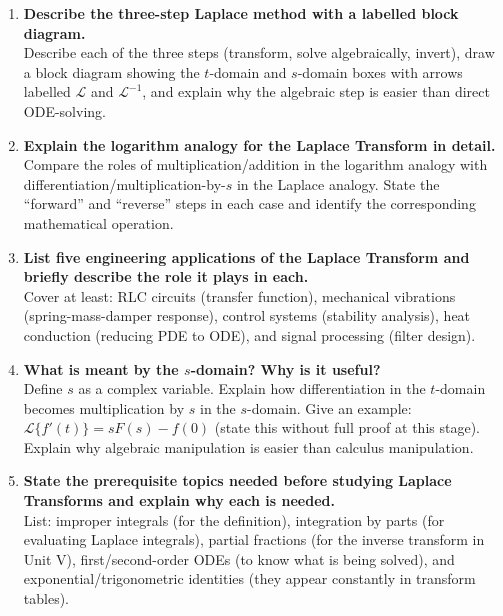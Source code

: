 \documentclass[12pt,a4paper]{article}
\begin{document}
\begin{enumerate}[label=\textbf{Q\arabic*.}, leftmargin=*, itemsep=8pt]

  \item \textbf{Describe the three-step Laplace method with a labelled block
        diagram.} \\
        Describe each of the three steps (transform, solve algebraically,
        invert), draw a block diagram showing the $t$-domain and $s$-domain
        boxes with arrows labelled $\mathcal{L}$ and $\mathcal{L}^{-1}$, and
        explain why the algebraic step is easier than direct ODE-solving.

  \item \textbf{Explain the logarithm analogy for the Laplace Transform in
        detail.} \\
        Compare the roles of multiplication/addition in the logarithm analogy
        with differentiation/multiplication-by-$s$ in the Laplace analogy.
        State the ``forward'' and ``reverse'' steps in each case and identify
        the corresponding mathematical operation.

  \item \textbf{List five engineering applications of the Laplace Transform
        and briefly describe the role it plays in each.} \\
        Cover at least: RLC circuits (transfer function), mechanical
        vibrations (spring-mass-damper response), control systems (stability
        analysis), heat conduction (reducing PDE to ODE), and signal
        processing (filter design).

  \item \textbf{What is meant by the $s$-domain?  Why is it useful?} \\
        Define $s$ as a complex variable.  Explain how differentiation in the
        $t$-domain becomes multiplication by $s$ in the $s$-domain.  Give an
        example: $\mathcal{L}\{f'(t)\} = sF(s) - f(0)$ (state this without
        full proof at this stage).  Explain why algebraic manipulation is
        easier than calculus manipulation.

  \item \textbf{State the prerequisite topics needed before studying Laplace
        Transforms and explain why each is needed.} \\
        List: improper integrals (for the definition), integration by parts
        (for evaluating Laplace integrals), partial fractions (for the inverse
        transform in Unit V), first/second-order ODEs (to know what is being
        solved), and exponential/trigonometric identities (they appear
        constantly in transform tables).

\end{enumerate}
\end{document}
